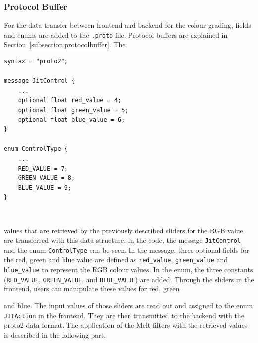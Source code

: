 \documentclass[../MasterThesis.tex]{subfiles}
\begin{document}
\subsubsection*{Protocol Buffer}

For the data transfer between frontend and backend for the colour grading, fields and enums are added to the \texttt{.proto} file. Protocol buffers are explained in Section~\ref{subsection:protocolbuffer}. The 
%
\begin{minipage}{0.54\textwidth}
\vspace*{-0.2em}
\begin{lstlisting}[style=protobufStyle, numbers=none]
syntax = "proto2";
	
message JitControl {
	...
	optional float red_value = 4;  
	optional float green_value = 5; 
	optional float blue_value = 6; 
}
	
enum ControlType {
	...
	RED_VALUE = 7;
	GREEN_VALUE = 8;
	BLUE_VALUE = 9;
}
\end{lstlisting}
\hfill
\end{minipage}\begin{minipage}{0.04\textwidth}
	\ 
\end{minipage}\begin{minipage}{0.42\textwidth}
\vspace*{0.7em}
values that are retrieved by the previously described sliders for the RGB value are transferred with this data structure.
In the code, the message \texttt{JitControl} and the enum \texttt{ControlType} can be seen. 
In the message, three optional fields for the red, green and blue value are defined as \texttt{red\_value}, \texttt{green\_value} and \texttt{blue\_value} to represent the RGB colour values. 
In the enum, the three constants (\texttt{RED\_VALUE}, \texttt{GREEN\_VALUE}, and \texttt{BLUE\_VALUE}) are added. 
Through the sliders in the frontend, users can manipulate these values for red, green

\end{minipage}

and blue. The input values of those sliders are read out and assigned to the enum \texttt{JITAction} in the frontend. They are then transmitted to the backend with the proto2 data format. The application of the Melt filters with the retrieved values is described in the following part.
\end{document}
